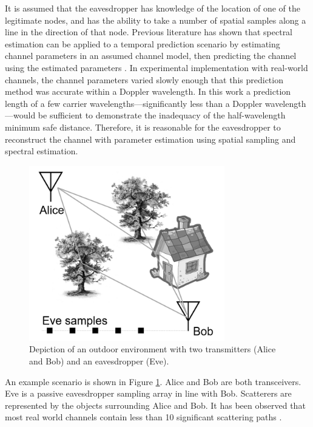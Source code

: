 \documentclass{allertonproc}
\begin{document}

It is assumed that the eavesdropper has knowledge of the location of one of the legitimate nodes, and has the ability to take a number of spatial samples along a line in the direction of that node.  Previous literature has shown that spectral estimation can be applied to a temporal prediction scenario by estimating channel parameters in an assumed channel model, then predicting the channel using the estimated parameters \cite{duel-hallen2007}. In experimental implementation with real-world channels, the channel parameters varied slowly enough that this prediction method was accurate within a Doppler wavelength. In this work a prediction length of a few carrier wavelengths---significantly less than a Doppler wavelength---would be sufficient to demonstrate the inadequacy of the half-wavelength minimum safe distance. Therefore, it is reasonable for the eavesdropper to reconstruct the channel with parameter estimation using spatial sampling and spectral estimation. 


\begin{figure}[tbp]
\begin{center}
\includegraphics[height=3in]{Scenario}
\caption{Depiction of an outdoor environment with two transmitters (Alice and Bob) and an eavesdropper (Eve).}\label{scene}
\end{center}
\end{figure}

An example scenario is shown in Figure \ref{scene}. Alice and Bob are both transceivers. Eve is a passive eavesdropper sampling array in line with Bob. Scatterers are represented by the objects surrounding Alice and Bob. It has been observed that most real world channels contain less than 10 significant scattering paths \cite{duel-hallen2000}. 
\end{document}
